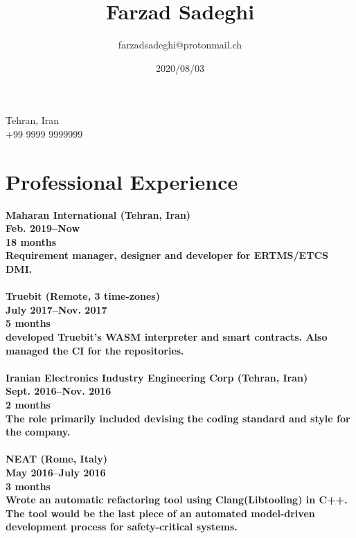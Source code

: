 \documentclass[8pt]{article}
\title{\bfseries Farzad Sadeghi}
\author{farzadsadeghi@protonmail.ch}
\date{2020/08/03}
\begin{document}
\begin{multicols}{2}
  \maketitle
  \begin{center}
    \begin{minipage}[ht]{0.2\textwidth}{\centering}
      \vspace*{\fill}
      \centering
      Tehran, Iran\\
      +99 9999 9999999
      \centering
      \vspace*{\fill}
    \end{minipage}
  \end{center}

  \section*{Professional Experience}
  \bf Maharan International (Tehran, Iran)\\
  Feb. 2019--Now\\
  18 months\\
  \normalfont Requirement manager, designer and developer for ERTMS/ETCS DMI.\\[5pt]
  \\
  \bf Truebit (Remote, 3 time-zones)\\
  July 2017--Nov. 2017\\
  5 months\\
  \normalfont developed Truebit's WASM interpreter and smart contracts. Also managed the CI for the repositories.\\[5pt]
  \\
  \bf Iranian Electronics Industry Engineering Corp (Tehran, Iran)\\
  Sept. 2016--Nov. 2016\\
  2 months\\
  \normalfont The role primarily included devising the coding standard and style for the company.\\[5pt]
  \\
  \bf NEAT (Rome, Italy)\\
  May 2016--July 2016\\
  3 months\\
  \normalfont Wrote an automatic refactoring tool using Clang(Libtooling) in C++. The tool would be the last piece of an automated model-driven development process for safety-critical systems.\\[5pt]
  \\

\end{multicols}
\end{document}
